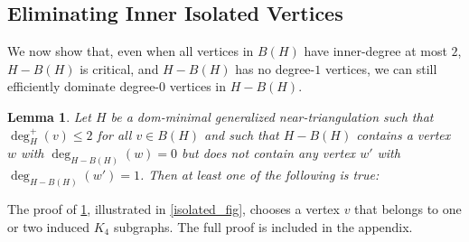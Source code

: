 \documentclass[a4paper,UKenglish,cleveref, autoref, thm-restate]{lipics-v2021}
\newtheorem{lem}{Lemma}
\begin{document}
\subsection{Eliminating Inner Isolated Vertices}
\label{zero_kill_sec}

We now show that, even when all vertices in $B(H)$ have inner-degree at most $2$, $H-B(H)$ is critical, and $H-B(H)$ has no degree-$1$ vertices, we can still efficiently dominate degree-$0$ vertices in $H-B(H)$.


\begin{lem}\label{degree_zero_killer}
  Let $H$ be a dom-minimal generalized near-triangulation such that $\deg^+_H(v)\le 2$ for all $v\in B(H)$ and such that $H-B(H)$ contains a vertex $w$ with $\deg_{H-B(H)}(w)=0$ but does not contain any vertex $w'$ with $\deg_{H-B(H)}(w')=1$.  Then at least one of the following is true:
\end{lem}

The proof of \cref{degree_zero_killer}, illustrated in \cref{isolated_fig}, chooses a vertex $v$ that belongs to one or two induced $K_4$ subgraphs.  The full proof is included in the appendix.
\end{document}
